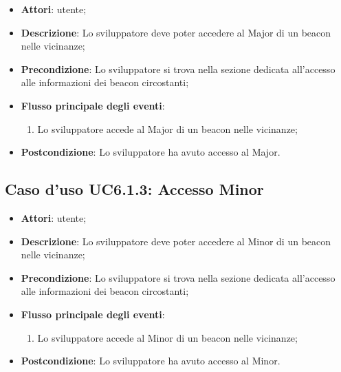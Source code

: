\documentclass[../AnalisiDeiRequisiti.tex]{subfiles}
\begin{document}
\begin{itemize}
\item \textbf{Attori}: utente;
\item \textbf{Descrizione}: Lo sviluppatore deve poter accedere al Major di un beacon nelle vicinanze; 
      \item \textbf{Precondizione}: Lo sviluppatore si trova nella sezione dedicata all'accesso alle informazioni dei beacon circostanti;

        \item \textbf{Flusso principale degli eventi}:
          \begin{enumerate}
          \item Lo sviluppatore accede al Major di un beacon nelle vicinanze;

      \end{enumerate}
    \item \textbf{Postcondizione}: Lo sviluppatore ha avuto accesso al Major.
  \end{itemize}
\hypertarget{UC6.1.3}{}
\subsection{Caso d'uso UC6.1.3: Accesso Minor}


\begin{itemize}
\item \textbf{Attori}: utente;
\item \textbf{Descrizione}: Lo sviluppatore deve poter accedere al Minor di un beacon nelle vicinanze; 
      \item \textbf{Precondizione}: Lo sviluppatore si trova nella sezione dedicata all'accesso alle informazioni dei beacon circostanti;

        \item \textbf{Flusso principale degli eventi}:
          \begin{enumerate}
          \item Lo sviluppatore accede al Minor di un beacon nelle vicinanze;

      \end{enumerate}
    \item \textbf{Postcondizione}: Lo sviluppatore ha avuto accesso al Minor.
  \end{itemize}
\hypertarget{UC6.1.4}{}
\end{document}
